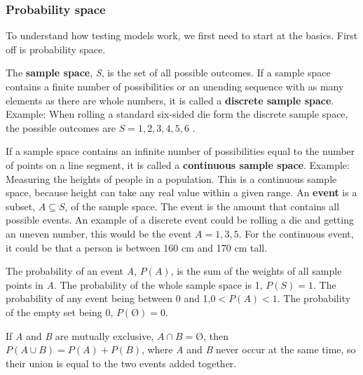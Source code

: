 \subsubsection{Probability space}
To understand how testing models work, we first need to start at the basics. First off is probability space. 

The \textbf{sample space}, \textit{S}, is the set of all possible outcomes.
\newline
If a sample space contains a finite number of possibilities or an unending sequence with as many elements as there are whole numbers, it is called a \textbf{discrete sample space}.
\newline
Example: When rolling a standard six-sided die form the discrete sample space, the possible outcomes are $S={1,2,3,4,5,6}$ .
\newline

\noindent If a sample space contains an infinite number of possibilities equal to the number of points on a line segment, it is called a \textbf{continuous sample space}.
\break
Example: Measuring the heights of people in a population. This is a continuous sample space, because height can take any real value within a given range. 
\newline
An \textbf{event} is a subset, $A\subseteq S$, of the sample space. The event is the amount that contains all possible events.
An example of a discrete event could be rolling a die and getting an uneven number, this would be the event $A={1,3,5}$.
\newline 
For the continuous event, it could be that a person is between 160 cm and 170 cm tall.
\newline

\noindent The probability of an event \textit{A}, $P(A)$, is the sum of the weights of all sample points in \textit{A}.
The probability of the whole sample space is 1, $P(S)=1$.
The probability of any event being between 0 and 1,$0<P(A)<1$.
The probability of the empty set being 0, $P(Ø)=0$.
\newline
\newline

\noindent If \textit{A} and \textit{B} are mutually exclusive, $A \cap B=Ø$, then
\newline
$P(A \cup B) = P(A)+P(B)$,
\newline
\newline
where \textit{A} and \textit{B} never occur at the same time, so their union is equal to the two events added together. 
\newline

